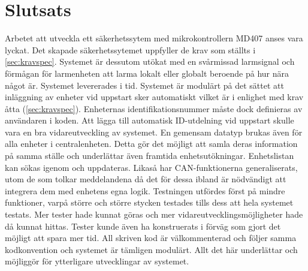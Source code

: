\section{Slutsats}
\label{sec:slutsatser}
Arbetet att utveckla ett säkerhetssytem med mikrokontrollern MD407 anses vara lyckat. Det skapade säkerhetssytemet uppfyller de krav som ställts i \ref{sec:kravspec}. Systemet är dessutom utökat med en svårmissad larmsignal och förmågan för larmenheten att larma lokalt eller globalt beroende på hur nära något är. Systemet levererades i tid.
\newline\newline
Systemet är modulärt på det sättet att inläggning av enheter vid uppstart sker automatiskt vilket är i enlighet med krav åtta (\ref{sec:kravspec}). Enheternas identifikationsnummer måste dock definieras av användaren i koden. Att lägga till automatisk ID-utdelning vid uppstart skulle vara en bra vidareutveckling av systemet. En gemensam datatyp brukas även för alla enheter i centralenheten. Detta gör det möjligt att samla deras information på samma ställe och underlättar även framtida enhetsutökningar. Enhetslistan kan sökas igenom och uppdateras. Likaså har CAN-funktionerna generaliserats, utom de som tolkar meddelandena då det för dessa ibland är nödvändigt att integrera dem med enhetens egna logik.
\newline\newline
Testningen utfördes först på mindre funktioner, varpå större och större stycken testades tills dess att hela systemet testats. Mer tester hade kunnat göras och mer vidareutvecklingsmöjligheter hade då kunnat hittas. Tester kunde även ha konstruerats i förväg som gjort det möjligt att spara mer tid.
\newline\newline
All skriven kod är välkommenterad och följer samma kodkonvention och systemet är tämligen modulärt. Allt det här underlättar och möjliggör för ytterligare utvecklingar av systemet.




